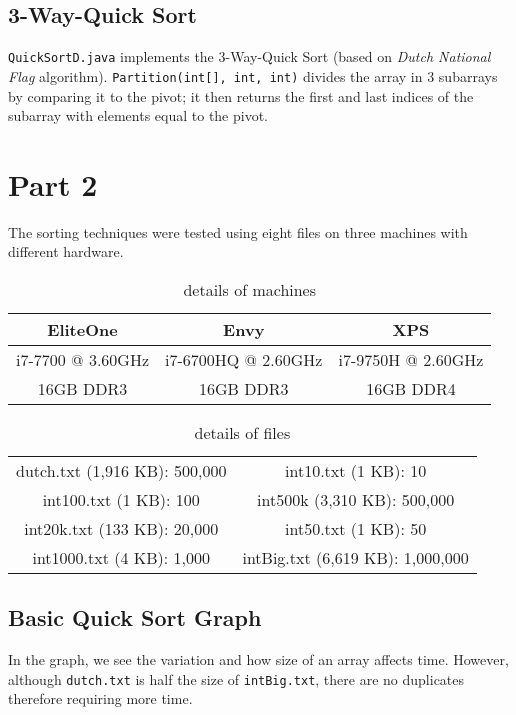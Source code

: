 \documentclass{article}
\newcommand{\code}[1]{\texttt{#1}}
\begin{document}
\subsection{3-Way-Quick Sort}
\code{QuickSortD.java} implements the 3-Way-Quick Sort (based on \textit{Dutch National Flag} algorithm). \code{Partition(int[], int, int)} divides the array in 3 subarrays by comparing it to the pivot; it then returns the first and last indices of the subarray with elements equal to the pivot.


\newpage
{}

\section{Part 2}
The sorting techniques were tested using eight files on three machines with different hardware.

\begin{table}[H]
\centering
\begin{tabular}{c|c|c}
\textbf{EliteOne} & \textbf{Envy}       & \textbf{XPS}       \\ \hline
i7-7700 @ 3.60GHz & i7-6700HQ @ 2.60GHz & i7-9750H @ 2.60GHz \\
16GB DDR3         & 16GB DDR3           & 16GB DDR4                             
\end{tabular}
\caption{details of machines}
\end{table}

\begin{table}[H]
\centering
\begin{tabular}{cc}
dutch.txt (1,916 KB): 500,000 & int10.txt (1 KB): 10             \\
int100.txt (1 KB): 100        & int500k (3,310 KB): 500,000      \\
int20k.txt (133 KB): 20,000   & int50.txt (1 KB): 50             \\
int1000.txt (4 KB): 1,000     & intBig.txt (6,619 KB): 1,000,000
\end{tabular}
\caption{details of files}
\end{table}

\bigskip

\subsection{Basic Quick Sort Graph}
In the graph, we see the variation and how size of an array affects time. However, although \code{dutch.txt} is half the size of \code{intBig.txt}, there are no duplicates therefore requiring more time. \\
\end{document}

